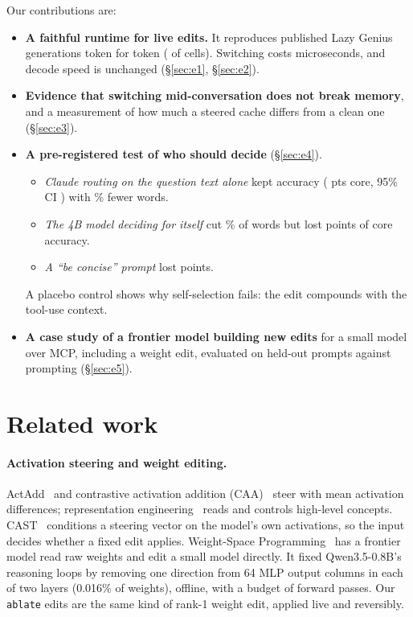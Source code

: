 Our contributions are:
\begin{itemize}
\item \textbf{A faithful runtime for live edits.} It reproduces published Lazy Genius generations token for token (\FidelityCells{} of \FidelityCells{} cells). Switching costs microseconds, and decode speed is unchanged (\S\ref{sec:e1}, \S\ref{sec:e2}).
\item \textbf{Evidence that switching mid-conversation does not break memory}, and a measurement of how much a steered cache differs from a clean one (\S\ref{sec:e3}).
\item \textbf{A pre-registered test of who should decide} (\S\ref{sec:e4}).
  \begin{itemize}
  \item \emph{Claude routing on the question text alone} kept accuracy (\RoutedCore{} pts core, 95\% CI \RoutedCoreCI) with \RoutedWords\% fewer words.
  \item \emph{The 4B model deciding for itself} cut \SelfWords\% of words but lost \SelfCoreAbs{} points of core accuracy.
  \item \emph{A ``be concise'' prompt} lost \PromptCoreAbs{} points.
  \end{itemize}
  A placebo control shows why self-selection fails: the edit compounds with the tool-use context.
\item \textbf{A case study of a frontier model building new edits} for a small model over MCP, including a weight edit, evaluated on held-out prompts against prompting (\S\ref{sec:e5}).
\end{itemize}

\section{Related work}

\paragraph{Activation steering and weight editing.} ActAdd~\cite{turner2023actadd} and contrastive activation addition (CAA)~\cite{rimsky2023caa} steer with mean activation differences; representation engineering~\cite{zou2023repe} reads and controls high-level concepts. CAST~\cite{lee2025cast} conditions a steering vector on the model's own activations, so the input decides whether a fixed edit applies. Weight-Space Programming~\cite{takehi2026wsp} has a frontier model read raw weights and edit a small model directly. It fixed Qwen3.5-0.8B's reasoning loops by removing one direction from 64 MLP output columns in each of two layers (0.016\% of weights), offline, with a budget of forward passes. Our \texttt{ablate} edits are the same kind of rank-1 weight edit, applied live and reversibly.

